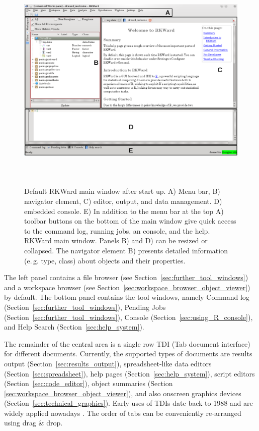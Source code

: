 \begin{figure}[htp]
 \centering
 \includegraphics[width=15.446cm,height=10.949cm]{../figures/main_window.png}
 \caption{Default RKWard main window after start up. 
A) Menu bar, B) navigator element, C) editor, output, 
and data management. D) embedded  console. 
E) In addition to the menu bar at the top A) toolbar buttons 
on the bottom of the main window give quick access to the command log, 
running jobs, an  console, and the  help. 
RKWard main window. Panels B) and D) can be resized or collapsed. The navigator element B)
presents detailed information (e.\,g. type, class) about objects and their properties.}
 \label{fig:main_window}
\end{figure}

The left panel contains a file browser (see Section~\ref{sec:further_tool_windows}) and a
workspace browser (see Section~\ref{sec:workspace_browser_object_viewer}) by default. The
bottom panel contains the tool windows, namely Command
log (Section~\ref{sec:further_tool_windows}), Pending Jobs (Section~\ref{sec:further_tool_windows}),  Console
(Section~\ref{sec:using_R_console}), and Help Search (Section~\ref{sec:help_system}).

The remainder of the central area is a single row TDI (Tab document
interface) for different documents. Currently, the supported types of
documents are results output (Section~\ref{sec:results_output}), spreadsheet-like data editors
(Section~\ref{sec:spreadsheet}), help pages (Section~\ref{sec:help_system}), script editors (Section~\ref{sec:code_editor}),
object summaries (Section \ref{sec:workspace_browser_object_viewer}), and also
 onscreen graphics devices (Section~\ref{sec:technical_graphics}). Early uses of TDIs date back to 1988 and are
widely applied nowadays \citep{Hopkins2005, MDN2010,
KimLutteroth2010}. The order of tabs can be conveniently re-arranged
using drag \& drop.

